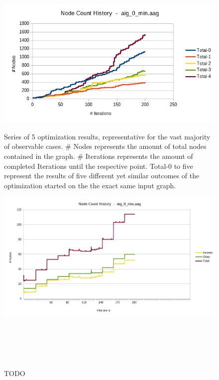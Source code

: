\documentclass[
	accentcolor=1c,%
	type=intern,
	marginpar=false,
	ruledheaders=section,
	class=report,
	BCOR=5mm,
      parskip=half-,
	fontsize=10pt
	]{tudapub}
\begin{document}
			\begin{figure}[!ht]
				\begin{minipage}{\textwidth}
					\centering
					\begin{minipage}{.45\textwidth}
						\includegraphics[width=\textwidth]{images/eval_4.png}
						\caption{Series of 5 optimization results, representative for the vast majority of observable cases. \# Nodes represents the amount of total nodes contained in the graph. \# Iterations represents the amount of completed Iterations until the respective point. Total-0 to five represent the results of five different yet similar outcomes of the optimization started on the the exact same input graph.}
						\label{fig_4}
					\end{minipage} \quad
					\begin{minipage}{.45\textwidth}
						\includegraphics[width=\textwidth]{images/eval_5.png}
						\caption{TODO}
						\label{fig_5}
					\end{minipage}\\
				\end{minipage}\\[1em]\\

\end{figure}
\end{document}
